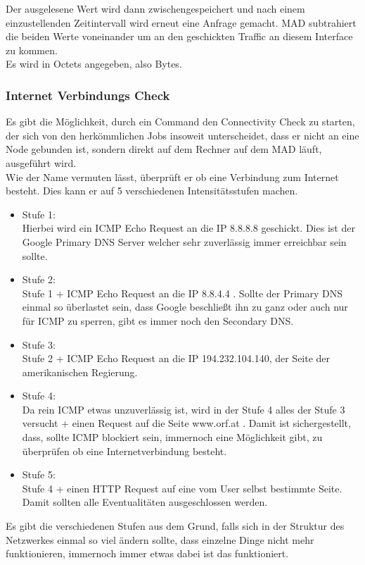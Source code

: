 \documentclass[12pt,a4paper]{report}
\begin{document}
Der ausgelesene Wert wird dann zwischengespeichert und nach einem einzustellenden Zeitintervall wird erneut eine Anfrage gemacht. MAD subtrahiert die beiden Werte voneinander um an den geschickten Traffic an diesem Interface zu kommen.\\
Es wird in Octets angegeben, also Bytes.

\subsubsection{Internet Verbindungs Check}
Es gibt die Möglichkeit, durch ein Command den Connectivity Check zu starten, der sich von den herkömmlichen Jobs insoweit unterscheidet, dass er nicht an eine Node gebunden ist, sondern direkt auf dem Rechner auf dem MAD läuft, ausgeführt wird.\\
Wie der Name vermuten lässt, überprüft er ob eine Verbindung zum Internet besteht. Dies kann er auf 5 verschiedenen Intensitätsstufen machen.\\
\begin{itemize}
\item Stufe 1:\\
Hierbei wird ein ICMP Echo Request an die IP 8.8.8.8 geschickt. Dies ist der Google Primary DNS Server welcher sehr zuverlässig immer erreichbar sein sollte.
\item Stufe 2:\\
Stufe 1 + ICMP Echo Request an die IP 8.8.4.4 . Sollte der Primary DNS einmal so überlastet sein, dass Google beschließt ihn zu ganz oder auch nur für ICMP zu sperren, gibt es immer noch den Secondary DNS.
\item Stufe 3:\\
Stufe 2 + ICMP Echo Request an die IP 194.232.104.140, der Seite der amerikanischen Regierung. 
\item Stufe 4:\\
Da rein ICMP etwas unzuverlässig ist, wird in der Stufe 4 alles der Stufe 3 versucht + einen Request auf die Seite www.orf.at . Damit ist sichergestellt, dass, sollte ICMP blockiert sein, immernoch eine Möglichkeit gibt, zu überprüfen ob eine Internetverbindung besteht.
\item Stufe 5:\\
Stufe 4 + einen HTTP Request auf eine vom User selbst bestimmte Seite. Damit sollten alle Eventualitäten ausgeschlossen werden. 
\end{itemize}

Es gibt die verschiedenen Stufen aus dem Grund, falls sich in der Struktur des Netzwerkes einmal so viel ändern sollte, dass einzelne Dinge nicht mehr funktionieren, immernoch immer etwas dabei ist das funktioniert.
\end{document}
